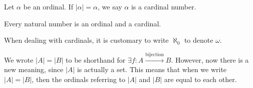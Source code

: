 \documentclass[10pt]{mypackage}
\begin{document}
\begin{definition}
  Let $\alpha$ be an ordinal. If $|\alpha| = \alpha$, we say $\alpha$ is a cardinal number.
\end{definition}
Every natural number is an ordinal and a cardinal.
\begin{notation}
  When dealing with cardinals, it is customary to write $\aleph_0$ to denote $\omega$.
\end{notation}
We wrote $\left\vert A \right\vert = \left\vert B \right\vert$ to be shorthand for $\exists f: A\xrightarrow{\text{bijection}}B$. However, now there is a new meaning, since $\left\vert A \right\vert$ is actually a set. This means that when we write $\left\vert A \right\vert = \left\vert B \right\vert$, then the ordinals referring to $\left\vert A \right\vert$ and $\left\vert B \right\vert$ are equal to each other.\newline
\end{document}
